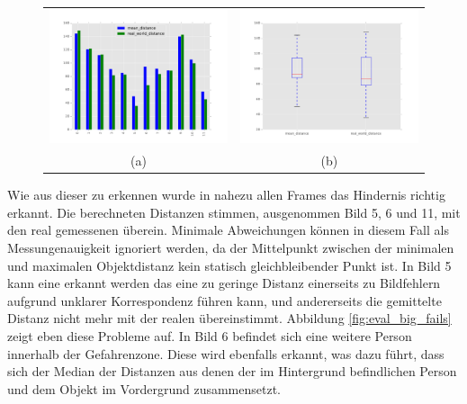 		    
	\begin{figure}[h]
		\centering
		\begin{tabular}{cc}
		\includegraphics[width=7cm]{img/evaluation/big_bar}&
		\includegraphics[width=7cm]{img/evaluation/big_box}\\
		 (a) & (b)
		\end{tabular}
		\caption{}
	    \label{fig:eval_big}
	\end{figure}
	
	\noindent
	Wie aus dieser zu erkennen wurde in nahezu allen Frames das Hindernis richtig erkannt. Die berechneten Distanzen stimmen, ausgenommen Bild 5, 6 und 11, mit den real gemessenen überein. Minimale Abweichungen können in diesem Fall als Messungenauigkeit ignoriert werden, da der Mittelpunkt zwischen der minimalen und maximalen Objektdistanz kein statisch gleichbleibender Punkt ist. In Bild 5 kann eine erkannt werden das eine zu geringe Distanz einerseits zu Bildfehlern aufgrund unklarer Korrespondenz führen kann, und andererseits die gemittelte Distanz nicht mehr mit der realen übereinstimmt. Abbildung \ref{fig:eval_big_fails} zeigt eben diese Probleme auf. In Bild 6 befindet sich eine weitere Person innerhalb der Gefahrenzone. Diese wird ebenfalls erkannt, was dazu führt, dass sich der Median der Distanzen aus denen der im Hintergrund befindlichen Person und dem Objekt im Vordergrund zusammensetzt.
	

